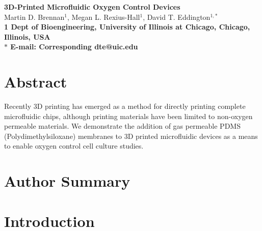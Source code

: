 \pagestyle{myheadings}







\begin{flushleft}
{\Large
\textbf{3D-Printed Microfluidic Oxygen Control Devices}
}
\\
Martin D. Brennan$^{1}$, 
Megan L. Rexius-Hall$^{1}$, 
David T. Eddington$^{1,\ast}$
\\
\bf{1} Dept of Bioengineering, University of Illinois at Chicago, Chicago, Illinois, USA
\\
$\ast$ E-mail: Corresponding dte@uic.edu
\end{flushleft}

\section*{Abstract}

Recently 3D printing has emerged as a method for directly printing complete microfluidic chips, 
although printing materials have been limited to non-oxygen permeable materials.
We demonstrate the addition of gas permeable PDMS (Polydimethylsiloxane) membranes to 3D printed microfluidic devices as a means to enable oxygen control cell culture studies.


\section*{Author Summary}



\section*{Introduction}

